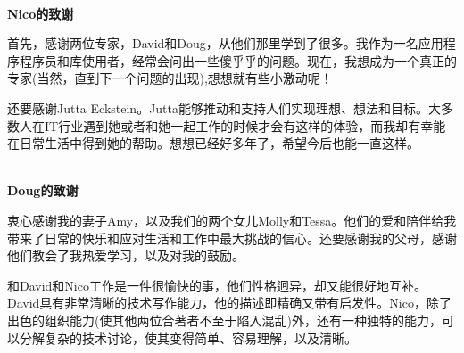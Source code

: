 \hspace*{\fill} \\ %
\noindent\textbf{Nico的致谢}

首先，感谢两位专家，David和Doug，从他们那里学到了很多。我作为一名应用程序程序员和库使用者，经常会问出一些傻乎乎的问题。现在，我想成为一个真正的专家(当然，直到下一个问题的出现),想想就有些小激动呢！

还要感谢Jutta Eckstein。Jutta能够推动和支持人们实现理想、想法和目标。大多数人在IT行业遇到她或者和她一起工作的时候才会有这样的体验，而我却有幸能在日常生活中得到她的帮助。想想已经好多年了，希望今后也能一直这样。

\hspace*{\fill} \\ %
\noindent\textbf{Doug的致谢}

衷心感谢我的妻子Amy，以及我们的两个女儿Molly和Tessa。他们的爱和陪伴给我带来了日常的快乐和应对生活和工作中最大挑战的信心。还要感谢我的父母，感谢他们教会了我热爱学习，以及对我的鼓励。

和David和Nico工作是一件很愉快的事，他们性格迥异，却又能很好地互补。David具有非常清晰的技术写作能力，他的描述即精确又带有启发性。Nico，除了出色的组织能力(使其他两位合著者不至于陷入混乱)外，还有一种独特的能力，可以分解复杂的技术讨论，使其变得简单、容易理解，以及清晰。


